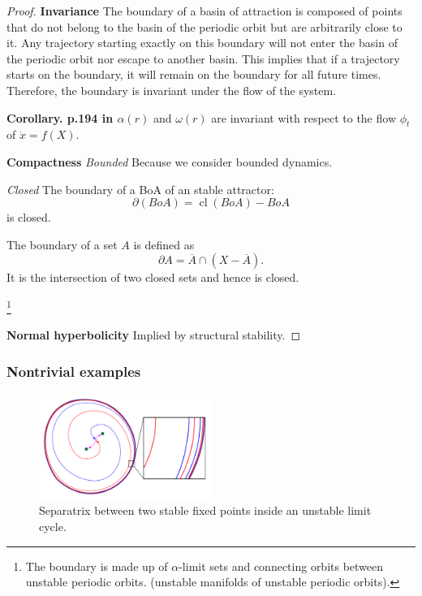 \documentclass{article}
\theoremstyle{definition}
\theoremstyle{remark}
\newcommand{\cl}{\operatorname{cl}}
\newcounter{ct}
\begin{document}
\begin{proof}
\textbf{Invariance}
The boundary of a basin of attraction is composed of points that do not belong to the basin of the periodic orbit but are arbitrarily close to it.
 Any trajectory starting exactly on this boundary will not enter the basin of the periodic orbit nor escape to another basin.
This implies that if a trajectory starts on the boundary, it will remain on the boundary for all future times. Therefore, the boundary is invariant under the flow of the system.


\textbf{Corollary. p.194 in \citep{perko2013differential}} \( \alpha(r) \) and \( \omega(r) \) are invariant with respect to the flow \( \phi_t \) of \(\dot x = f(X)\). %

\textbf{Compactness}
\textit{Bounded} Because we consider bounded dynamics.

\textit{Closed} 
The boundary of a BoA of an stable attractor:
\[\partial(BoA) = \cl(BoA) -  BoA\]
is closed.

The boundary of a set \( A \) is defined as 
\[
\partial A = \overline{A} \cap (X - \overline{A}).
\]
It is the intersection of two closed sets and hence is closed.


\footnote{
The boundary is made up of 
$\alpha$-limit sets 
and
connecting orbits between unstable periodic orbits.
(unstable manifolds of unstable periodic orbits).
}


\textbf{Normal hyperbolicity}
Implied by structural stability.

\end{proof}



\subsubsection{Nontrivial examples}

\setlength\belowcaptionskip{-5ex}
\begin{figure}
  \centering
  \includegraphics[width=0.5\textwidth]{unstab_lc_3fps}
  \caption{Separatrix between two stable fixed points inside an unstable limit cycle.
  }\label{fig:unstab_lc_3fps}
\end{figure}
\end{document}
